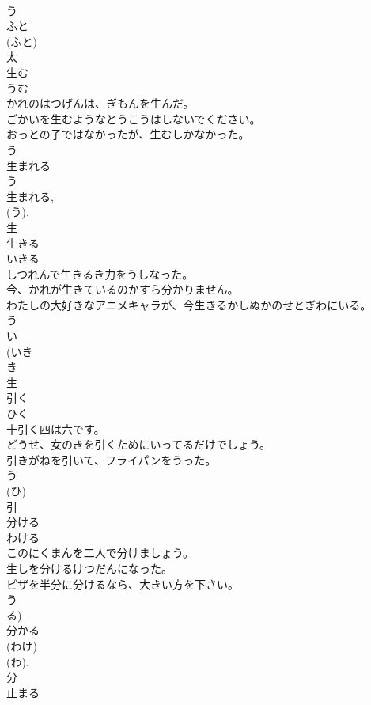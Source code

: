 \documentclass[8pt]{extreport}
\begin{document}
\begin{CJK}{UTF8}{min}
\\	う 
\\	ふと 
\\	(ふと) 
\\	太	
\\	生む	
\\	うむ	
\\	かれのはつげんは、ぎもんを生んだ。	
\\	ごかいを生むようなとうこうはしないでください。	
\\	おっとの子ではなかったが、生むしかなかった。	
\\	う 
\\	生まれる 
\\	う 
\\	生まれる, 
\\	(う).
\\	生	
\\	生きる	
\\	いきる	
\\	しつれんで生きるき力をうしなった。	
\\	今、かれが生きているのかすら分かりません。	
\\	わたしの大好きなアニメキャラが、今生きるかしぬかのせとぎわにいる。	
\\	う 
\\	い 
\\	(いき 
\\	き 
\\	生	
\\	引く	
\\	ひく	
\\	十引く四は六です。	
\\	どうせ、女のきを引くためにいってるだけでしょう。	
\\	引きがねを引いて、フライパンをうった。	
\\	う 
\\	(ひ) 
\\	引	
\\	分ける	
\\	わける	
\\	このにくまんを二人で分けましょう。	
\\	生しを分けるけつだんになった。	
\\	ピザを半分に分けるなら、大きい方を下さい。	
\\	う 
\\	る) 
\\	分かる 
\\	(わけ) 
\\	(わ). 
\\	分	
\\	止まる	

\end{CJK}
\end{document}
